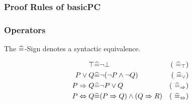 \subsubsection{Proof Rules of basicPC}
%	
%

\subsubsection{Operators}

The $\widehat{=}$-Sign denotes a syntactic equivalence.

\begin{align*}
	\top & \widehat{=} \neg \bot 
	& \text{( $\widehat{=}_{\top}$)} \\
	P \lor Q & \widehat{=} \neg(\neg P \land \neg Q)
	& \text{( $\widehat{=}_{\lor}$)} \\
	P \Rightarrow Q & \widehat{=} \neg P \lor Q
	& \text{( $\widehat{=}_{\Rightarrow}$)} \\
	P \Leftrightarrow Q & \widehat{=} (P\Rightarrow Q) \land (Q \Rightarrow R)
	& \text{( $\widehat{=}_{\Leftrightarrow}$)} \\
\end{align*}


